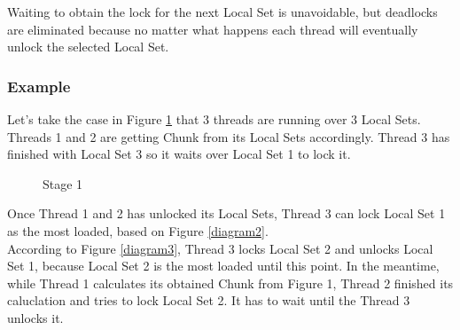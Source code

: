 \documentclass[12pt,a4paper]{article}
\begin{document}
Waiting to obtain the lock for the next Local Set is unavoidable, but deadlocks are eliminated because no matter what happens each thread will eventually unlock the selected Local Set.

\subsubsection{Example}
Let's take the case in Figure \ref{diagram1} that 3 threads are running over 3 Local Sets. Threads 1 and 2 are getting Chunk from its Local Sets accordingly. Thread 3 has finished with Local Set 3 so it waits over Local Set 1 to lock it.\\

\begin{figure}[h!]
	\centering
	\caption{Stage 1} \label{diagram1}
\end{figure}


Once Thread 1 and 2 has unlocked its Local Sets, Thread 3 can lock Local Set 1 as the most loaded, based on Figure \ref{diagram2}.\\

According to Figure \ref{diagram3}, Thread 3 locks Local Set 2 and unlocks Local Set 1, because Local Set 2 is the most loaded until this point. In the meantime, while Thread 1 calculates its obtained Chunk from Figure 1, Thread 2 finished its caluclation and tries to lock Local Set 2. It has to wait until the Thread 3 unlocks it.\\
 
\end{document}
